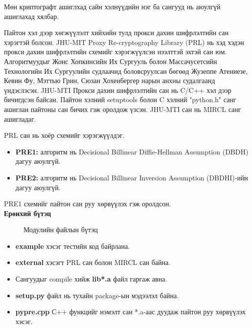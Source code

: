 Мөн криптографт ашиглхад сайн хэлнүүдийн нэг ба сангууд нь аюулгүй ашиглахад хялбар.\cite{cryptographyTopLanguaes}

Пайтон хэл дээр хөгжүүлэлт хийхийн тулд прокси дахин шифрлэлтийн сан хэрэгтэй болсон.
JHU-MIT Proxy Re-cryptography Library (PRL) нь хэд хэдэн прокси дахин шифрлэлтийн схемийг хэрэгжүүлсэн нээлттэй эхтэй сан юм. Алгоритмуудыг Жонс Хопкинсийн Их Сургууль болон Массачусетсийн Технологийн Их Сургуулийн судлаачид боловсруулсан бөгөөд Жузеппе Атениезе, Кевин Фу, Мэттью Грин, Сюзан Хохенбергер нарын анхны судалгаанд үндэслэсэн. 
JHU-MTI Прокси дахин шифрлэлтийн сан нь C/C++ хэл дээр бичигдсэн байсан. Пайтон хэлний setuptools болон C хэлний "python.h" санг ашиглан пайтоны сан бичих гэж оролдож үзсэн. JHU-MTI сан нь MIRCL санг ашигладаг.

PRL сан нь хоёр схемийг хэрэгжүүлдэг.
\begin{itemize}
    \item \textbf{PRE1:} алгоритм нь Decisional Billinear Diffie-Hellman Assumption (DBDH) дагуу аюулгүй.
    \item \textbf{PRE2:} алгоритм нь Decisional Billinear Inversion Assumption (DBDHI)-ийн дагуу аюулгүй.
\end{itemize}

PRE1 схемийг пайтон сан руу хөрвүүлэх гэж оролдсон.\\
\textbf{Ерөнхий бүтэц}

\begin{figure}
\caption{Модулийн файлын бүтэц}
\end{figure}

\begin{itemize}
    \item \textbf{example} хэсэг тестийн код байрлана.
    \item \textbf{external} хэсэгт PRL сан болон MIRCL сан байна.
    \item Сангуудыг compile хийж \textbf{lib*.a} файл гаргаж авна.
    \item \textbf{setup.py} файл нь тухайн package-ын мэдээлэл байна.
    \item \textbf{pypre.cpp} С++ функцийг нэмэлт сан *.a-аас дуудаж пайтон руу хөрвүүлэх хэсэг. 
\end{itemize}

